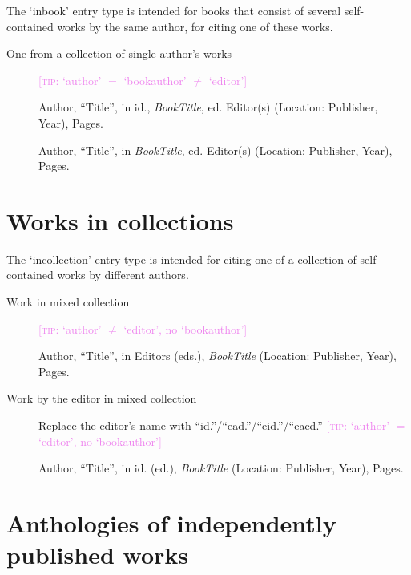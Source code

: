 \documentclass[extrafontsizes,11pt,a4paper,oneside]{memoir}
\newcommand*{\lit}[1]{\textsf{#1}}
\newcommand*{\code}[1]{`\textsf{#1}'}
\newcommand*{\aside}[1]{\textcolor{violet}{[\textsc{tip:} #1]}}
\begin{document}
The \code{inbook} entry type is intended for books that consist of several self-contained works by the same author, for citing one of these works. 

\begin{description}
  \item[One from a collection of single author's works] \aside{\code{author} $=$ \code{bookauthor} $\neq$ \code{editor}}
  \par Author, \enquote{Title}, \lit{in id.}, \emph{BookTitle}, \lit{ed.} Editor(s) (Location: Publisher, Year), Pages.
  \\
  \par Author, \enquote{Title}, \lit{in} \emph{BookTitle}, \lit{ed.} Editor(s) (Location: Publisher, Year), Pages.
\end{description}

\section{Works in collections}

The \code{incollection} entry type is intended for citing one of a collection of self-contained works by different authors.

\begin{description}
  \item[Work in mixed collection] \aside{\code{author} $\neq$ \code{editor}, no \code{bookauthor}}
  \par Author, \enquote{Title}, \lit{in} Editors (\lit{eds.}), \emph{BookTitle} (Location: Publisher, Year), Pages.
  \\
  
  \item[Work by the editor in mixed collection] Replace the editor's name with \enquote{id.}\slash \enquote{ead.}\slash \enquote{eid.}\slash \enquote{eaed.} \aside{\code{author} $=$ \code{editor}, no \code{bookauthor}}
  \par Author, \enquote{Title}, \lit{in id.} (\lit{ed.}), \emph{BookTitle} (Location: Publisher, Year), Pages.
  \\
  
\end{description}

\section{Anthologies of independently published works}
\end{document}
